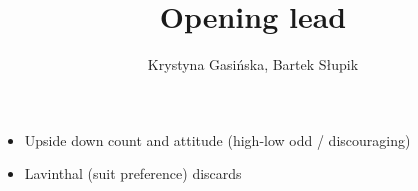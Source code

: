 \documentclass[12pt, a4paper]{article}
\title{Opening lead}
\author{Krystyna Gasińska, Bartek Słupik}
\begin{document}
\maketitle


\begin{itemize}
    \item Upside down count and attitude (high-low odd / discouraging)
    \item Lavinthal (suit preference) discards
\end{itemize}


\end{document}
